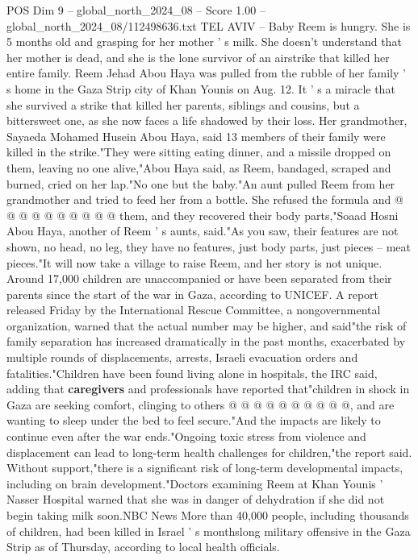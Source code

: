 \begin{textsample}{POS Dim 9 – global\_north\_2024\_08 – Score 1.00 – global\_north\_2024\_08/112498636.txt}  \label{ex:f9_pos_191}
TEL AVIV -- Baby Reem is hungry.
She is 5 months old and grasping for her mother ' s milk.
She doesn't understand that her mother is dead, and she is the lone survivor of an airstrike that killed her entire family.
Reem Jehad Abou Haya was pulled from the rubble of her family ' s home in the Gaza Strip city of Khan Younis on Aug. 12.
It ' s a miracle that she survived a strike that killed her parents, siblings and cousins, but a bittersweet one, as she now faces a life shadowed by their loss.
Her grandmother, Sayaeda Mohamed Husein Abou Haya, said 13 members of their family were killed in the strike."They were sitting eating dinner, and a missile dropped on them, leaving no one alive,"Abou Haya said, as Reem, bandaged, scraped and burned, cried on her lap."No one but the baby."An aunt pulled Reem from her grandmother and tried to feed her from a bottle.
She refused the formula and @ @ @ @ @ @ @ @ @ @ them, and they recovered their body parts,"Soaad Hosni Abou Haya, another of Reem ' s aunts, said."As you saw, their features are not shown, no head, no leg, they have no features, just body parts, just pieces -- meat pieces."It will now take a village to raise Reem, and her story is not unique.
Around 17,000 children are unaccompanied or have been separated from their parents since the start of the war in Gaza, according to UNICEF.
A report released Friday by the International Rescue Committee, a nongovernmental organization, warned that the actual number may be higher, and said"the risk of family separation has increased dramatically in the past months, exacerbated by multiple rounds of displacements, arrests, Israeli evacuation orders and fatalities."Children have been found living alone in hospitals, the IRC said, adding that \textbf{caregivers} and professionals have reported that"children in shock in Gaza are seeking comfort, clinging to others @ @ @ @ @ @ @ @ @ @, and are wanting to sleep under the bed to feel secure."And the impacts are likely to continue even after the war ends."Ongoing toxic stress from violence and displacement can lead to long-term health challenges for children,"the report said.
Without support,"there is a significant risk of long-term developmental impacts, including on brain development."Doctors examining Reem at Khan Younis ' Nasser Hospital warned that she was in danger of dehydration if she did not begin taking milk soon.NBC News More than 40,000 people, including thousands of children, had been killed in Israel ' s monthslong military offensive in the Gaza Strip as of Thursday, according to local health officials.

\end{textsample}

